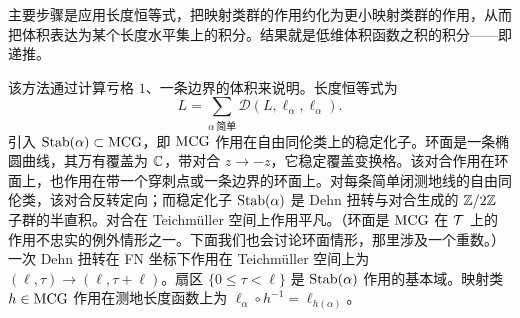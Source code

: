 

主要步骤是应用长度恒等式，把映射类群的作用约化为更小映射类群的作用，从而把体积表达为某个长度水平集上的积分。结果就是低维体积函数之积的积分——即递推。

该方法通过计算亏格 $1$、一条边界的体积来说明。长度恒等式为
\[
L=\sum_{\alpha\ \text{简单}}\mathcal{D}(L,\ell_\alpha,\ell_\alpha).
\]
引入 $\mathrm{Stab}(\alpha)\subset\mathrm{MCG}$，即 $\mathrm{MCG}$ 作用在自由同伦类上的稳定化子。环面是一条椭圆曲线，其万有覆盖为 $\mathbb{C}$，带对合 $z\to-z$，它稳定覆盖变换格。该对合作用在环面上，也作用在带一个穿刺点或一条边界的环面上。对每条简单闭测地线的自由同伦类，该对合反转定向；而稳定化子 $\mathrm{Stab}(\alpha)$ 是 Dehn 扭转与对合生成的 $\mathbb{Z}/2\mathbb{Z}$ 子群的半直积。对合在 Teichmüller 空间上作用平凡。（环面是 $\mathrm{MCG}$ 在 $\mathcal{T}$ 上的作用不忠实的例外情形之一。下面我们也会讨论环面情形，那里涉及一个重数。）一次 Dehn 扭转在 FN 坐标下作用在 Teichmüller 空间上为 $(\ell,\tau)\to(\ell,\tau+\ell)$。扇区 $\{0\le\tau<\ell\}$ 是 $\mathrm{Stab}(\alpha)$ 作用的基本域。映射类 $h\in\mathrm{MCG}$ 作用在测地长度函数上为 $\ell_\alpha\circ h^{-1}=\ell_{h(\alpha)}$。

